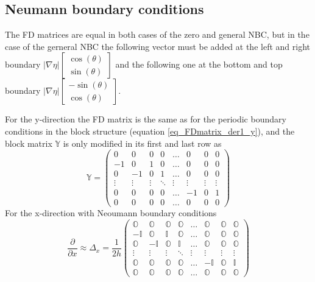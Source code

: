 \subsection{Neumann boundary conditions}
The FD matrices are equal in both cases of the zero and general NBC, but in the case of the gerneral NBC the following vector must be added at the left and right boundary $|\nabla\eta|\left[\begin{array}{c}
	\cos(\theta)  \\
	\sin(\theta) 
\end{array}\right]$ and the following one at the bottom and top boundary  $|\nabla\eta|\left[\begin{array}{c}
	-\sin(\theta)  \\
	\cos(\theta)
\end{array}\right]$.

For the y-direction the FD matrix is the same as for the periodic boundary conditions in the block structure (equation \ref{eq_FDmatrix_der1_y}), and the block matrix $\mathbb{Y}$ is only modified in its first and last row as
\begin{equation}
	\mathbb{Y} = \left(\begin{array}{cccccccc}
		0 & 0 & 0&  0 & \dots & 0 & 0 & 0 \\
		-1 & 0 &  1& 0 & \dots& 0 & 0 & 0\\
		0 &-1&0 & 1 & \dots & 0 & 0 & 0\\
		\vdots&\vdots&\vdots&\ddots &\vdots&\vdots&\vdots&\vdots\\
		0 & 0 & 0 &0 &  \dots & -1 & 0 & 1 \\
		0 & 0 & 0 &0 &  \dots & 0 &0  &0
	\end{array}\right)
\end{equation}
For the x-direction with Neoumann boundary conditions
\begin{equation}
	\frac{\partial }{\partial x} \approx \Delta_x = \frac{1}{2h}
	\left(\begin{array}{cccccccc}
		\mathbb{O} & \mathbb{O} & \mathbb{O}& \mathbb{O}&\dots &\mathbb{O} &  \mathbb{O} &  \mathbb{O}  \\
		-\mathbb{I}&\mathbb{O} &  \mathbb{I}& \mathbb{O}&\dots&\mathbb{O}&  \mathbb{O}&\mathbb{O}\\
		\mathbb{O}& -\mathbb{I}&\mathbb{O} & \mathbb{I}& \dots & \mathbb{O}&  \mathbb{O}&  \mathbb{O}\\
		\vdots&\vdots&\vdots&\ddots &\vdots&\vdots&\vdots&\vdots\\
		\mathbb{O}&\mathbb{O}&\mathbb{O}&\mathbb{O}&\dots & -\mathbb{I}&  \mathbb{O} & \mathbb{I} \\
		\mathbb{O} &\mathbb{O} &\mathbb{O}&\mathbb{O}&\dots &\mathbb{O}& \mathbb{O} &\mathbb{O}
	\end{array}\right)
\end{equation}

